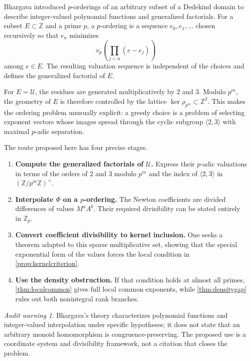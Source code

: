 \documentclass[11pt]{article}
\theoremstyle{definition}
\theoremstyle{remark}
\newtheorem{warning}[theorem]{Audit warning}
\newcommand{\Z}{\mathbb{Z}}
\begin{document}
Bhargava introduced $p$-orderings of an arbitrary subset of a Dedekind domain to describe
integer-valued polynomial functions and generalized factorials.  For a subset
$E\subset\Z$ and a prime $p$, a $p$-ordering is a sequence
$e_0,e_1,\ldots$ chosen recursively so that $e_n$ minimizes
\[
       v_p\!\left(\prod_{j<n}(e-e_j)\right)
\]
among $e\in E$.  The resulting valuation sequence is independent of the choices and defines
the generalized factorial of $E$.

For $E=\mathcal U$, the residues are generated multiplicatively by $2$ and $3$.  Modulo
$p^m$, the geometry of $E$ is therefore controlled by the lattice
$\ker\rho_{p^m}\subset\Z^2$.  This makes the ordering problem unusually explicit: a greedy
choice is a problem of selecting exponent vectors whose images spread through the cyclic subgroup
$\langle2,3\rangle$ with maximal $p$-adic separation.

The route proposed here has four precise stages.
\begin{enumerate}[leftmargin=2.2em]
\item \textbf{Compute the generalized factorials of $\mathcal U$.}  Express their $p$-adic
      valuations in terms of the orders of $2$ and $3$ modulo $p^m$ and the index of
      $\langle2,3\rangle$ in $(\Z/p^m\Z)^\times$.
\item \textbf{Interpolate $\Phi$ on a $p$-ordering.}  The Newton coefficients are divided
      differences of values $M^aA^b$.  Their required divisibility can be stated entirely in
      $\Z_p$.
\item \textbf{Convert coefficient divisibility to kernel inclusion.}  One seeks a theorem
      adapted to this sparse multiplicative set, showing that the special exponential form of
      the values forces the local condition in \cref{prop:kernelcriterion}.
\item \textbf{Use the density obstruction.}  If that condition holds at almost all primes,
      \cref{thm:localcommon} gives full local common exponents, while
      \cref{thm:densitygap} rules out both nonintegral rank branches.
\end{enumerate}

\begin{warning}
Bhargava's theory characterizes polynomial functions and integer-valued interpolation under
specific hypotheses; it does not state that an arbitrary monoid homomorphism is
congruence-preserving.  The proposed use is a coordinate system and divisibility framework, not a
citation that closes the problem.
\end{warning}
\end{document}
